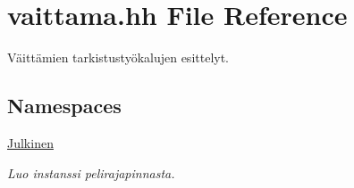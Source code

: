 \hypertarget{vaittama_8hh}{}\section{vaittama.\+hh File Reference}
\label{vaittama_8hh}


Väittämien tarkistustyökalujen esittelyt.  


\subsection*{Namespaces}
\begin{DoxyCompactItemize}
\item 
 \hyperlink{namespace_julkinen}{Julkinen}
\begin{DoxyCompactList}\small\item\em Luo instanssi pelirajapinnasta. \end{DoxyCompactList}\end{DoxyCompactItemize}
